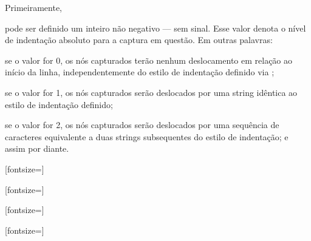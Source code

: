 \documentclass
  [11pt,a4paper,english,brazil,openright,sumario=tradicional,twoside]
  {abntex2}
\begin{document}
  Primeiramente,
  \begin{inparaenum}
    \item pode ser definido um inteiro não negativo --- sem sinal. Esse valor
          denota o nível de indentação absoluto para a captura em questão. Em
          outras palavras:
          \begin{inparaenum}
            \item se o valor for 0, os nós capturados terão nenhum deslocamento
                  em relação ao início da linha, independentemente do estilo de
                  indentação definido via ;
            \item se o valor for 1, os nós capturados serão deslocados por uma
                  string idêntica ao estilo de indentação definido;
            \item se o valor for 2, os nós capturados serão deslocados por uma
                  sequência de caracteres equivalente a duas strings
                  subsequentes do estilo de indentação; e assim por diante.
          \end{inparaenum}

          \newsavebox\querystringregex
          \begin{lrbox}{\querystringregex}
            \codesnippetinline{[-0-9a-zA-Z]}[fontsize=\footnotesize]
          \end{lrbox}

          \newsavebox\indentruleabs
          \begin{lrbox}{\indentruleabs}
              [fontsize=\footnotesize]
          \end{lrbox}

          \newsavebox\indentruleneg
          \begin{lrbox}{\indentruleneg}
              [fontsize=\footnotesize]
          \end{lrbox}

          \newsavebox\indentrulepos
          \begin{lrbox}{\indentrulepos}
              [fontsize=\footnotesize]
          \end{lrbox}


\end{inparaenum}
\end{document}

